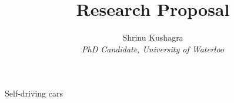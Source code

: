 \documentclass[11pt]{article}
\title{\textbf{Research Proposal}}
\author{Shrinu Kushagra\\
\textit{PhD Candidate, University of Waterloo}}
\date{}
\begin{document}
\maketitle

Self-driving cars
\end{document}
